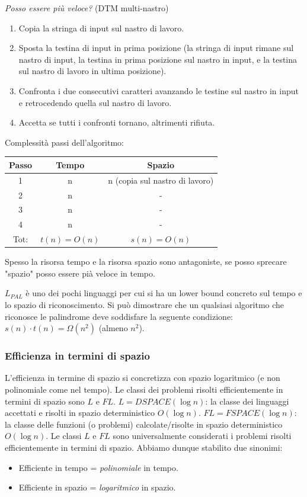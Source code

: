 \documentclass{article}
\begin{document}
\noindent\textit{Posso essere più veloce?} (DTM multi-nastro)
\begin{enumerate}
    \item Copia la stringa di input sul nastro di lavoro.
    \item Sposta la testina di input in prima posizione (la stringa di input rimane
          sul nastro di input, la testina in prima posizione sul nastro in input, e la testina
          sul nastro di lavoro in ultima posizione).
    \item Confronta i due consecutivi caratteri avanzando le testine sul nastro in input
          e retrocedendo quella sul nastro di lavoro.
    \item Accetta se tutti i confronti tornano, altrimenti rifiuta.
\end{enumerate}
Complessità passi dell'algoritmo:
\begin{center}
    \begin{tabular}{c c c}
        Passo & Tempo       & Spazio                         \\
        \midrule
        1     & n           & n (copia sul nastro di lavoro) \\
        2     & n           & -                              \\
        3     & n           & -                              \\
        4     & n           & -                              \\
        \midrule
        Tot:  & $t(n)=O(n)$ & $s(n)=O(n)$
    \end{tabular}
\end{center}
Spesso la risorsa tempo e la risorsa spazio sono antagoniste, se posso sprecare "spazio"
posso essere pià veloce in tempo.

$L_{PAL}$ è uno dei pochi linguaggi per cui si ha un lower bound concreto sul
tempo e lo spazio di riconoscimento. Si può dimostrare che un qualsiasi algoritmo
che riconosce le palindrome deve soddisfare la
seguente condizione: $s(n)\cdot t(n)=\Omega(n^2)$ (almeno $n^2$).

\subsubsection{Efficienza in termini di spazio}
L'efficienza in termine di spazio si concretizza con spazio logaritmico (e non polinomiale
come nel tempo). Le classi dei problemi risolti efficientemente in termini di spazio sono $L$
e $FL$.
$L=DSPACE(\log n)$: la classe dei linguaggi accettati e risolti in spazio deterministico $O(\log n)$.
$FL=FSPACE(\log n)$: la classe delle funzioni (o problemi) calcolate/risolte in spazio deterministico
$O(\log n)$.
Le classi $L$ e $FL$ sono universalmente considerati i problemi risolti efficientemente in termini
di spazio. Abbiamo dunque stabilito due sinonimi:
\begin{itemize}
    \item Efficiente in tempo = \textit{polinomiale} in tempo.
    \item Efficiente in spazio = \textit{logaritmico} in spazio.
\end{itemize}
\end{document}

